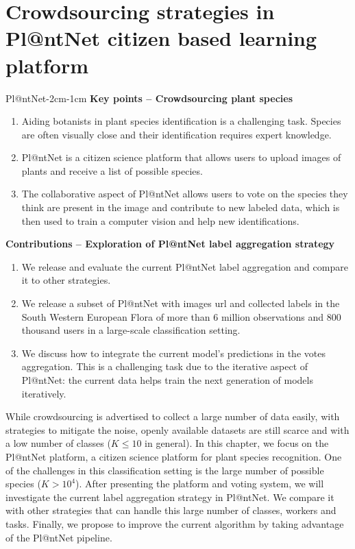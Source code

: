 \chapter{Crowdsourcing strategies in Pl@ntNet citizen based learning platform}
\label{chap:plantnet}
\enlargethispage{3\baselineskip}

\begin{keypointstwomargins}{Pl@ntNet}{-2cm}{-1cm}
        \textbf{Key points -- Crowdsourcing plant species}
        \begin{enumerate}[leftmargin=*]
        \item Aiding botanists in plant species identification is a challenging task. Species are often visually close and their identification requires expert knowledge.
        \item Pl@ntNet is a citizen science platform that allows users to upload images of plants and receive a list of possible species.
        \item The collaborative aspect of Pl@ntNet allows users to vote on the species they think are present in the image and contribute to new labeled data, which is then used to train a computer vision and help new identifications.
        \end{enumerate}

        \textbf{Contributions -- Exploration of Pl@ntNet label aggregation strategy}
        \begin{enumerate}[leftmargin=*,start=4]
        \item We release and evaluate the current Pl@ntNet label aggregation and compare it to other strategies.
        \item We release a subset of Pl@ntNet with images url and collected labels in the South Western European Flora of more than $6$ million observations and $800$ thousand users in a large-scale classification setting.
        \item We discuss how to integrate the current model's predictions in the votes aggregation. This is a challenging task due to the iterative aspect of Pl@ntNet: the current data helps train the next generation of models iteratively.
        \end{enumerate}
\end{keypointstwomargins}

While crowdsourcing is advertised to collect a large number of data easily, with strategies to mitigate the noise, openly available datasets are still scarce and with a low number of classes ($K\leq 10$ in general).
In this chapter, we focus on the Pl@ntNet platform, a citizen science platform for plant species recognition.
One of the challenges in this classification setting is the large number of possible species ($K>10^4$).
After presenting the platform and voting system, we will investigate the current label aggregation strategy in Pl@ntNet.
We compare it with other strategies that can handle this large number of classes, workers and tasks.
Finally, we propose to improve the current algorithm by taking advantage of the Pl@ntNet pipeline.


